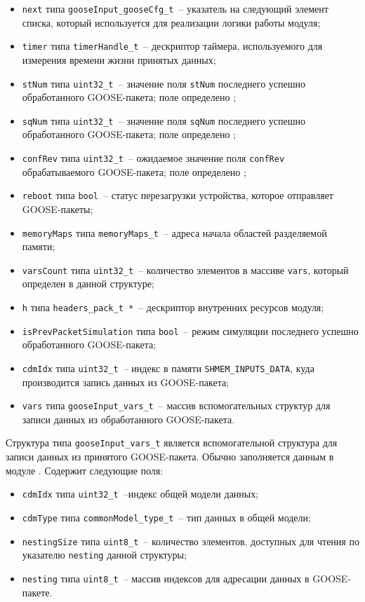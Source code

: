 \begin{itemize}
    \item \lstinline{next} типа \lstinline{gooseInput_gooseCfg_t}~-- указатель на следующий элемент списка, который используется для реализации логики работы модуля;
    \item \lstinline{timer} типа \lstinline{timerHandle_t}~-- дескриптор таймера, используемого для измерения времени жизни принятых данных;
    \item \lstinline{stNum} типа \lstinline{uint32_t}~-- значение поля \lstinline{stNum} последнего успешно обработанного GOOSE-пакета; поле определено \iecStd;
    \item \lstinline{sqNum} типа \lstinline{uint32_t}~-- значение поля \lstinline{sqNum} последнего успешно обработанного GOOSE-пакета; поле определено \iecStd;
    \item \lstinline{confRev} типа \lstinline{uint32_t}~-- ожидаемое значение поля \lstinline{confRev} обрабатываемого GOOSE-пакета; поле определено \iecStd;
    \item \lstinline{reboot} типа \lstinline{bool}~-- статус перезагрузки устройства, которое отправляет GOOSE-пакеты;
    \item \lstinline{memoryMaps} типа \lstinline{memoryMaps_t}~-- адреса начала областей разделяемой памяти;
    \item \lstinline{varsCount} типа \lstinline{uint32_t}~-- количество элементов в массиве \lstinline{vars}, который определен в данной структуре;
    \item \lstinline{h} типа \lstinline{headers_pack_t *}~-- дескриптор внутренних ресурсов модуля;
    \item \lstinline{isPrevPacketSimulation} типа \lstinline{bool}~-- режим симуляции последнего успешно обработанного GOOSE-пакета;
    \item \lstinline{cdmIdx} типа \lstinline{uint32_t}~-- индекс в памяти \lstinline{SHMEM_INPUTS_DATA}, куда производится запись данных из GOOSE-пакета;
    \item \lstinline{vars} типа \lstinline{gooseInput_vars_t}~-- массив вспомогательных структур для записи данных из обработанного GOOSE-пакета.
\end{itemize}

Структура типа \lstinline{gooseInput_vars_t} является вспомогательной структура для записи данных из принятого GOOSE-пакета. Обычно заполняется данным в модуле
\moduleCfg. Содержит следующие поля:

\begin{itemize}
    \item \lstinline{cdmIdx} типа \lstinline{uint32_t}~--индекс общей модели данных;
    \item \lstinline{cdmType} типа \lstinline{commonModel_type_t}~-- тип данных в общей модели;
    \item \lstinline{nestingSize} типа \lstinline{uint8_t}~-- количество элементов, доступных для чтения по указателю \lstinline{nesting} данной структуры;
    \item \lstinline{nesting} типа \lstinline{uint8_t}~-- массив индексов для адресации данных в GOOSE-пакете.
\end{itemize}

